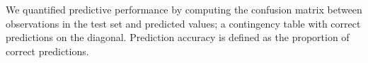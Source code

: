 \documentclass[a4paper,usenames,dvipsnames]{article}
\newenvironment{revision}{\color{teal}}{\color{black}}
\begin{document}
We quantified predictive performance by computing the confusion matrix between \begin{revision}observations in the test set\end{revision} and predicted values; a contingency table with correct predictions on the diagonal. Prediction accuracy is defined as the \begin{revision}proportion of correct predictions\end{revision}.

\end{document}
